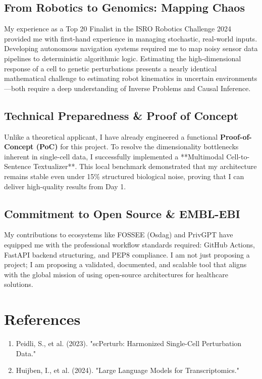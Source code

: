 \documentclass[12pt,a4paper]{article}
\begin{document}
\subsection*{From Robotics to Genomics: Mapping Chaos}
My experience as a Top 20 Finalist in the ISRO Robotics Challenge 2024 provided me with first-hand experience in managing stochastic, real-world inputs. Developing autonomous navigation systems required me to map noisy sensor data pipelines to deterministic algorithmic logic. Estimating the high-dimensional response of a cell to genetic perturbations presents a nearly identical mathematical challenge to estimating robot kinematics in uncertain environments—both require a deep understanding of Inverse Problems and Causal Inference.

\subsection*{Technical Preparedness \& Proof of Concept}
Unlike a theoretical applicant, I have already engineered a functional \textbf{Proof-of-Concept (PoC)} for this project. To resolve the dimensionality bottlenecks inherent in single-cell data, I successfully implemented a **Multimodal Cell-to-Sentence Textualizer**. This local benchmark demonstrated that my architecture remains stable even under 15\% structured biological noise, proving that I can deliver high-quality results from Day 1.

\subsection*{Commitment to Open Source \& EMBL-EBI}
My contributions to ecosystems like FOSSEE (Osdag) and PrivGPT have equipped me with the professional workflow standards required: GitHub Actions, FastAPI backend structuring, and PEP8 compliance. I am not just proposing a project; I am proposing a validated, documented, and scalable tool that aligns with the global mission of using open-source architectures for healthcare solutions.

\section{References}
\begin{enumerate}
    \item Peidli, S., et al. (2023). "scPerturb: Harmonized Single-Cell Perturbation Data."
    \item Huijben, I., et al. (2024). "Large Language Models for Transcriptomics."
\end{enumerate}
\end{document}
